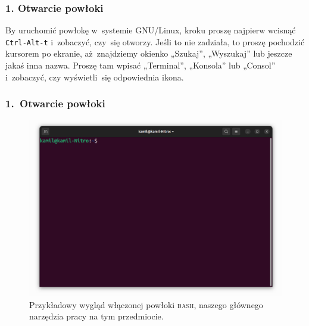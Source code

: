 \documentclass[10pt,t]{beamer}
\begin{document}
\begin{frame}
  \frametitle{1. Otwarcie powłoki}


  By uruchomić powłokę w~systemie GNU/Linux, kroku proszę najpierw wcisnąć
  \texttt{Ctrl-Alt-t} i~zobaczyć, czy~się otworzy. Jeśli to nie zadziała,
  to proszę pochodzić kursorem po ekranie, aż~znajdziemy okienko „Szukaj”,
  „Wyszukaj” lub jeszcze jakaś inna nazwa. Proszę tam wpisać „Terminal”,
  „Konsola” lub „Consol” i~zobaczyć, czy wyświetli~się odpowiednia ikona.

\end{frame}





\begin{frame}
  \frametitle{1.~Otwarcie powłoki}


  \begin{figure}

    \centering


    \includegraphics[scale=0.23]
    {./Presentations-pictures/BASH-shell.png}


    \caption{Przykładowy wygląd włączonej powłoki \textsc{bash}, naszego
      głównego narzędzia pracy na tym przedmiocie.}


    \label{fig:BASH-shell}

  \end{figure}

\end{frame}
\end{document}
